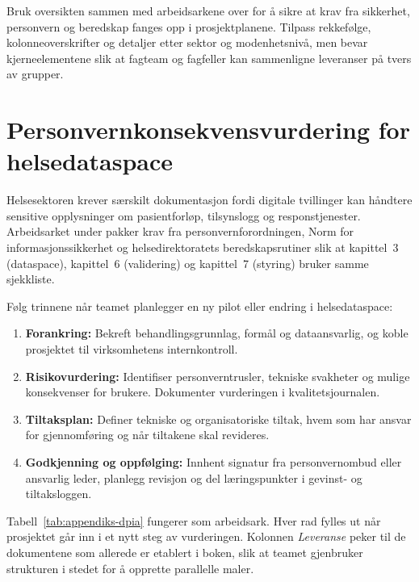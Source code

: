 Bruk oversikten sammen med arbeidsarkene over for å sikre at krav fra sikkerhet, personvern og
beredskap fanges opp i prosjektplanene. Tilpass rekkefølge, kolonneoverskrifter og detaljer etter
sektor og modenhetsnivå, men bevar kjerneelementene slik at fagteam og fagfeller kan sammenligne
leveranser på tvers av grupper.

\section{Personvernkonsekvensvurdering for helsedataspace}
Helsesektoren krever særskilt dokumentasjon fordi digitale tvillinger kan håndtere
sensitive opplysninger om pasientforløp, tilsynslogg og responstjenester. Arbeidsarket under
pakker krav fra personvernforordningen, Norm for informasjonssikkerhet og helsedirektoratets
beredskapsrutiner slik at kapittel~3 (dataspace), kapittel~6 (validering) og kapittel~7 (styring)
bruker samme sjekkliste.\citep{datatilsynet2023dpia,norm2023,helsedir2023beredskap}

Følg trinnene når teamet planlegger en ny pilot eller endring i helsedataspace:

\begin{enumerate}[label=\alph*.]
    \item \textbf{Forankring:} Bekreft behandlingsgrunnlag, formål og dataansvarlig, og koble
    prosjektet til virksomhetens internkontroll.
    \item \textbf{Risikovurdering:} Identifiser personverntrusler, tekniske svakheter og mulige
    konsekvenser for brukere. Dokumenter vurderingen i kvalitetsjournalen.
    \item \textbf{Tiltaksplan:} Definer tekniske og organisatoriske tiltak, hvem som har ansvar for
    gjennomføring og når tiltakene skal revideres.
    \item \textbf{Godkjenning og oppfølging:} Innhent signatur fra personvernombud eller ansvarlig
    leder, planlegg revisjon og del læringspunkter i gevinst- og tiltaksloggen.
\end{enumerate}

Tabell~\ref{tab:appendiks-dpia} fungerer som arbeidsark. Hver rad fylles ut når prosjektet går
inn i et nytt steg av vurderingen. Kolonnen \emph{Leveranse} peker til de dokumentene som allerede
er etablert i boken, slik at teamet gjenbruker strukturen i stedet for å opprette parallelle
maler.

